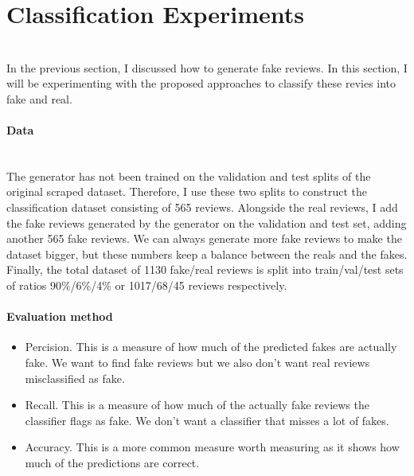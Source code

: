 \documentclass{article}
\begin{document}
\section{Classification Experiments}$ $
\\In the previous section, I discussed how to generate fake reviews. In this section, I will be experimenting with the proposed approaches to classify these revies into fake and real.

\paragraph{Data}$ $
\\ The generator has not been trained on the validation and test splits of the original scraped dataset. Therefore, I use these two splits to construct the classification dataset consisting of 565 reviews.  Alongside the real reviews, I add the fake reviews generated by the generator on the validation and test set, adding another 565 fake reviews. We can always generate more fake reviews to make the dataset bigger, but these numbers keep a balance between the reals and the fakes. Finally, the total dataset of 1130 fake/real reviews is split into train/val/test sets of ratios 90\%/6\%/4\% or 1017/68/45 reviews respectively.

\paragraph{Evaluation method}
\begin{itemize}
\item Percision. This is a measure of how much of the predicted fakes are actually fake. We want to find fake reviews but we also don't want real reviews misclassified as fake.
\item Recall. This is a measure of how much of the actually fake reviews the classifier flags as fake. We don't want a classifier that misses a lot of fakes.
\item Accuracy. This is a more common measure worth measuring as it shows how much of the predictions are correct.
\end{itemize}
\end{document}
